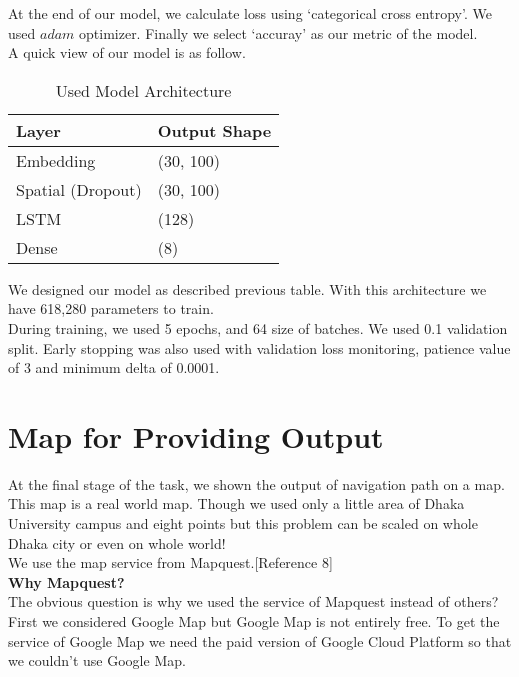 At the end of our model, we calculate loss using `categorical cross entropy'. We used $adam$ optimizer. Finally we select `accuray' as our metric of the model. \\

A quick view of our model is as follow. \\

\begin{table}[]
    \centering
    \begin{tabular}{|l|l|}
        \hline
        Layer             & Output Shape \\ \hline
        Embedding         & (30, 100)    \\ \hline
        Spatial (Dropout) & (30, 100)    \\ \hline
        LSTM              & (128)        \\ \hline
        Dense             & (8)          \\ \hline
    \end{tabular}
    \caption{Used Model Architecture}
\end{table}

We designed our model as described previous table. With this architecture we have 618,280 parameters to train. \\

During training, we used 5 epochs, and 64 size of batches. We used 0.1 validation split. Early stopping was also used with validation loss monitoring, patience value of 3 and minimum delta of 0.0001. \\



\section{Map for Providing Output}
At the final stage of the task, we shown the output of navigation path on a map. This map is a real world map. Though we used only a little area of Dhaka University campus and eight points but this problem can be scaled on whole Dhaka city or even on whole world! \\

We use the map service from Mapquest.[Reference 8] \\

\textbf{Why Mapquest?} \\
The obvious question is why we used the service of Mapquest instead of others? \\

First we considered Google Map but Google Map is not entirely free. To get the service of Google Map we need the paid version of Google Cloud Platform so that we couldn't use Google Map. \\

